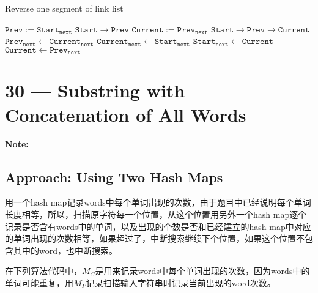 \documentclass[a4paper,12pt]{article}
\begin{document}
\begin{algorithm}[H]
\caption{Reverse one segment of link list }
\begin{algorithmic}[1]
\Statex
{}
\State $\mathtt{Prev} := \mathtt{Start}_{\mathtt{next}}$ \Comment $\mathtt{Start} \to \mathtt{Prev}$
\State $\mathtt{Current} := \mathtt{Prev}_{\mathtt{next}}$ \Comment $\mathtt{Start} \to \mathtt{Prev} \to \mathtt{Current}$
\State $\mathtt{Prev}_{\mathtt{next}} \gets \mathtt{Current}_{\mathtt{next}} $
\State $\mathtt{Current}_{\mathtt{next}} \gets \mathtt{Start}_{\mathtt{next}} $ 
\State $\mathtt{Start}_{\mathtt{next}} \gets \mathtt{Current}$ 
\State $\mathtt{Current} \gets \mathtt{Prev}_{\mathtt{next}}$ 
\EndWhile
\EndProcedure
\Statex
\end{algorithmic}
\end{algorithm}

\section{30 --- Substring with Concatenation of All Words}
\textbf{\large{Note:}}
\subsection{Approach: Using Two Hash Maps}
\begin{CJK*}{UTF8}{gbsn}
用一个hash map记录words中每个单词出现的次数，由于题目中已经说明每个单词长度相等，所以，扫描原字符每一个位置，从这个位置用另外一个hash map逐个记录是否含有words中的单词，以及出现的个数是否和已经建立的hash map中对应的单词出现的次数相等，如果超过了，中断搜索继续下个位置，如果这个位置不包含其中的word，也中断搜索。
\par
在下列算法代码中，$M_{C}$是用来记录words中每个单词出现的次数，因为words中的单词可能重复，用$M_{P}$记录扫描输入字符串时记录当前出现的word次数。
\clearpage
\end{CJK*}
\end{document}
